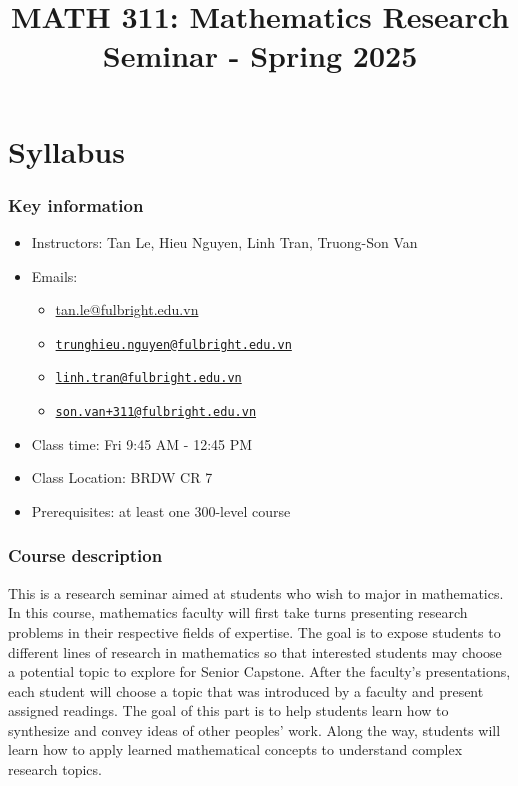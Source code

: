\documentclass[
  openany]{book}
\title{MATH 311: Mathematics Research Seminar - Spring 2025}
\author{}
\date{\vspace{-2.5em}}
\providecommand{\tightlist}{%
  \setlength{\itemsep}{0pt}\setlength{\parskip}{0pt}}
\begin{document}
\maketitle

\hypertarget{syllabus}{%
\chapter*{Syllabus}\label{syllabus}}

\hypertarget{key-information}{%
\subsection*{Key information}\label{key-information}}

\begin{itemize}
\tightlist
\item
  Instructors: Tan Le, Hieu Nguyen, Linh Tran, Truong-Son Van
\item
  Emails:

  \begin{itemize}
  \tightlist
  \item
    \href{mailto:tan.le@fulgright.edu.vn}{tan.le@fulbright.edu.vn}
  \item
    \href{mailto:trunghieu.nguyen@fulbright.edu.vn}{\nolinkurl{trunghieu.nguyen@fulbright.edu.vn}}
  \item
    \href{mailto:linh.tran@fulbright.edu.vn}{\nolinkurl{linh.tran@fulbright.edu.vn}}
  \item
    \href{mailto:son.van+311@fulbright.edu.vn}{\nolinkurl{son.van+311@fulbright.edu.vn}}
  \end{itemize}
\item
  Class time: Fri 9:45 AM - 12:45 PM
\item
  Class Location: BRDW CR 7
\item
  Prerequisites: at least one 300-level course
\end{itemize}

\hypertarget{course-description}{%
\subsection*{Course description}\label{course-description}}

This is a research seminar aimed at students who wish to major in mathematics.
In this course, mathematics faculty will first take turns presenting research problems in
their respective fields of expertise. The goal is to expose students
to different lines of research in mathematics so that interested students may
choose a potential topic to explore for Senior Capstone.
After the faculty's presentations, each student will choose a topic that was introduced by a
faculty and present assigned readings.
The goal of this part is to help students learn how to synthesize and convey ideas
of other peoples' work. Along the way, students will learn how to apply learned
mathematical concepts to understand complex research topics.
\end{document}
